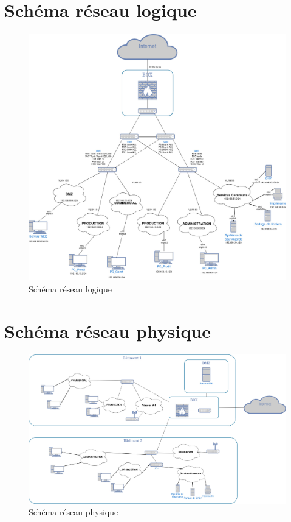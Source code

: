 \documentclass[a4paper,12pt,openany]{report}
\begin{document}
\begin{appendices}
        \chapter{Schéma réseau logique}
            \begin{figure}[H]
                \centering
                \includegraphics[width=1.0\textwidth]{Images/Schema_logique.jpg}
                \caption{Schéma réseau logique}
            \end{figure}
        \chapter{Schéma réseau physique}
            \begin{figure}[H]
                \centering
                \includegraphics[width=1.2\textwidth]{Images/Schema_physique.jpg}
                \caption{Schéma réseau physique}
            \end{figure}

\end{appendices}
\end{document}
